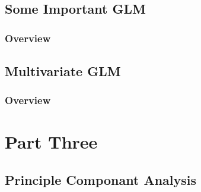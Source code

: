 \documentclass[11pt,fleqn]{book} %
\begin{document}


\chapter{Some Important GLM}

\section{Overview}



\chapter{Multivariate GLM}

\section{Overview}



 \part{Part Three}



\chapter{Principle Componant Analysis}
\end{document}
